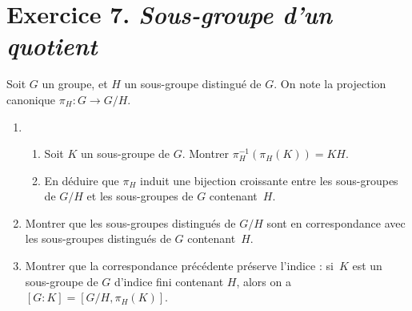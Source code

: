 \documentclass[./main]{subfiles}
\begin{document}
  \section{Exercice 7. \textit{Sous-groupe d'un quotient}}
  \begin{enonce}
    Soit $G$ un groupe, et $H$ un sous-groupe distingué de $G$. On note la projection canonique $\pi_H : G \to G/H$.
    \begin{enumerate}
      \item
        \begin{enumerate}
          \item Soit $K$ un sous-groupe de $G$. Montrer $\pi_H^{-1}(\pi_H(K)) = K H$.
          \item En déduire que $\pi_H$ induit une bijection croissante entre les sous-groupes de $G / H$ et les sous-groupes de $G$ contenant~$H$.
        \end{enumerate}
      \item Montrer que les sous-groupes distingués de $G / H$ sont en correspondance avec les sous-groupes distingués de $G$ contenant~$H$.
      \item Montrer que la correspondance précédente préserve l'indice : si~$K$ est un sous-groupe de $G$ d'indice fini contenant $H$, alors on a $[G : K] = [G/H, \pi_H(K)]$.
    \end{enumerate}
  \end{enonce}
\end{document}
